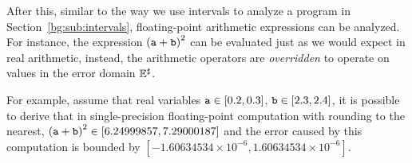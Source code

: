After this, similar to the way we use intervals to analyze a program in
Section~\ref{bg:sub:intervals}, floating-point arithmetic expressions can be
analyzed.  For instance, the expression ${(\texttt{a} + \texttt{b})}^2$ can be evaluated
just as we would expect in real arithmetic, instead, the arithmetic operators
are \emph{overridden} to operate on values in the error domain $\mathbb{E}^\sharp$.

For example, assume that real variables $\texttt{a} \in [0.2, 0.3]$, $\texttt{b} \in
[2.3, 2.4]$, it is possible to derive that in single-precision floating-point
computation with rounding to the nearest, ${(\texttt{a} + \texttt{b})}^2 \in [6.24999857,
7.29000187]$ and the error caused by this computation is bounded by
$[-1.60634534\times10^{-6}, 1.60634534\times10^{-6}]$.
